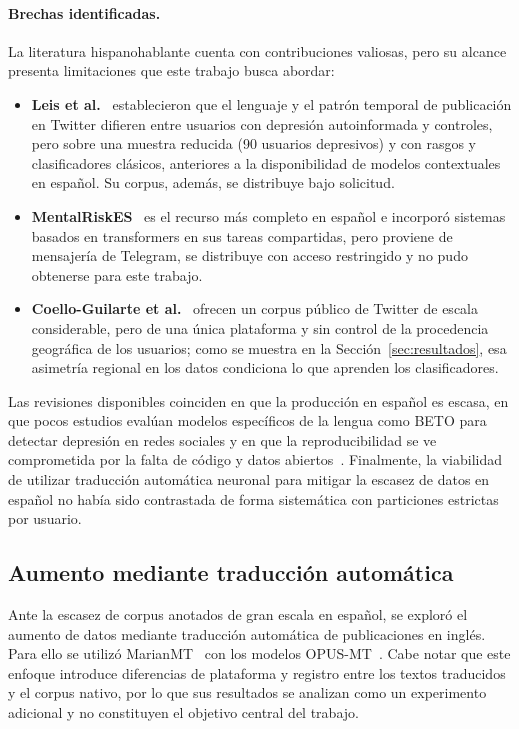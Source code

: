 \documentclass[12pt,a4paper]{article}
\begin{document}
\paragraph{Brechas identificadas.} La literatura hispanohablante cuenta con contribuciones valiosas, pero su alcance presenta limitaciones que este trabajo busca abordar:
\begin{itemize}[leftmargin=2em]
    \item \textbf{Leis et al.}~\cite{leis2019detecting,leis2021tesis} establecieron que el lenguaje y el patrón temporal de publicación en Twitter difieren entre usuarios con depresión autoinformada y controles, pero sobre una muestra reducida (90 usuarios depresivos) y con rasgos y clasificadores clásicos, anteriores a la disponibilidad de modelos contextuales en español. Su corpus, además, se distribuye bajo solicitud.
    \item \textbf{MentalRiskES}~\cite{marmol2024mentalriskes,marmol2023overview} es el recurso más completo en español e incorporó sistemas basados en transformers en sus tareas compartidas, pero proviene de mensajería de Telegram, se distribuye con acceso restringido y no pudo obtenerse para este trabajo.
    \item \textbf{Coello-Guilarte et al.}~\cite{coello2019} ofrecen un corpus público de Twitter de escala considerable, pero de una única plataforma y sin control de la procedencia geográfica de los usuarios; como se muestra en la Sección~\ref{sec:resultados}, esa asimetría regional en los datos condiciona lo que aprenden los clasificadores.
\end{itemize}
Las revisiones disponibles coinciden en que la producción en español es escasa, en que pocos estudios evalúan modelos específicos de la lengua como BETO para detectar depresión en redes sociales y en que la reproducibilidad se ve comprometida por la falta de código y datos abiertos~\cite{aleman2024pln,mieles2024revision,yanez2023upm}. Finalmente, la viabilidad de utilizar traducción automática neuronal para mitigar la escasez de datos en español no había sido contrastada de forma sistemática con particiones estrictas por usuario.

\subsection{Aumento mediante traducción automática}
Ante la escasez de corpus anotados de gran escala en español, se exploró el aumento de datos mediante traducción automática de publicaciones en inglés. Para ello se utilizó MarianMT~\cite{junczys2018marian} con los modelos OPUS-MT~\cite{tiedemann2020opus}. Cabe notar que este enfoque introduce diferencias de plataforma y registro entre los textos traducidos y el corpus nativo, por lo que sus resultados se analizan como un experimento adicional y no constituyen el objetivo central del trabajo.
\end{document}
